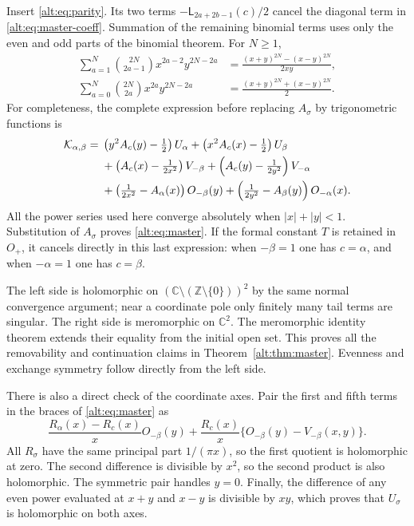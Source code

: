 Insert \eqref{alt:eq:parity}. Its two terms
$-\mathsf L_{2a+2b-1}(c)/2$ cancel the diagonal term in
\eqref{alt:eq:master-coeff}. Summation of the remaining binomial terms
uses only the even and odd parts of the binomial theorem. For $N\ge1$,
\begin{align*}
 \sum_{a=1}^{N}\binom{2N}{2a-1}x^{2a-2}y^{2N-2a}
 &=\frac{(x+y)^{2N}-(x-y)^{2N}}{2xy},\\
 \sum_{a=0}^{N}\binom{2N}{2a}x^{2a}y^{2N-2a}
 &=\frac{(x+y)^{2N}+(x-y)^{2N}}2.
\end{align*}
For completeness, the complete expression before replacing $A_\sigma$
by trigonometric functions is
\begin{align}
 \mathcal K_{\alpha,\beta}
 ={}&\left(y^2A_c(y)-\tfrac12\right)U_\alpha
    +\left(x^2A_c(x)-\tfrac12\right)U_\beta\notag\\
 &+\left(A_c(x)-\tfrac1{2x^2}\right)V_{-\beta}
    +\left(A_c(y)-\tfrac1{2y^2}\right)V_{-\alpha}\notag\\
 &+\left(\tfrac1{2x^2}-A_\alpha(x)\right)O_{-\beta}(y)
    +\left(\tfrac1{2y^2}-A_\beta(y)\right)O_{-\alpha}(x).
 \label{alt:eq:master-before-trig}
\end{align}
All the power series used here converge absolutely when
$|x|+|y|<1$. Substitution of $A_\sigma$ proves
\eqref{alt:eq:master}. If the formal constant $T$ is retained in $O_+$,
it cancels directly in this last expression: when $-\beta=1$ one has
$c=\alpha$, and when $-\alpha=1$ one has $c=\beta$.

The left side is holomorphic on
$(\mathbb C\setminus(\mathbb Z\setminus\{0\}))^2$ by the same normal
convergence argument; near a coordinate pole only finitely many tail
terms are singular. The right side is meromorphic on $\mathbb C^2$.
The meromorphic identity theorem extends their equality from the
initial open set. This proves all the removability and continuation
claims in Theorem~\ref{alt:thm:master}. Evenness and exchange symmetry
follow directly from the left side.

There is also a direct check of the coordinate axes. Pair the first
and fifth terms in the braces of \eqref{alt:eq:master} as
\[
 \frac{R_\alpha(x)-R_c(x)}xO_{-\beta}(y)
 +\frac{R_c(x)}x\{O_{-\beta}(y)-V_{-\beta}(x,y)\}.
\]
All $R_\sigma$ have the same principal part $1/(\pi x)$, so the
first quotient is holomorphic at zero. The second difference is
divisible by $x^2$, so the second product is also holomorphic.
The symmetric pair handles $y=0$. Finally, the difference of any
even power evaluated at $x+y$ and $x-y$ is divisible by $xy$,
which proves that $U_\sigma$ is holomorphic on both axes.


